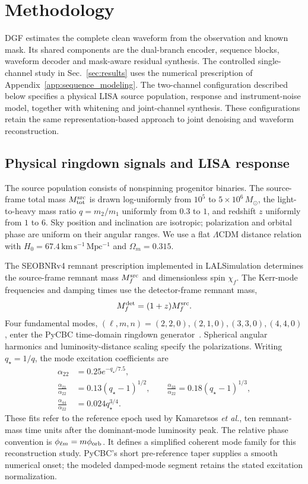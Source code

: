 \documentclass[10pt,prd,aps,a4paper,twocolumn,superscriptaddress,nofootinbib,floatfix]{revtex4-2}
\begin{document}
\section{Methodology}\label{sec:method}
DGF estimates the complete clean waveform from the observation and known mask. Its shared components are the dual-branch encoder, sequence blocks, waveform decoder and mask-aware residual synthesis. The controlled single-channel study in Sec.~\ref{sec:results} uses the numerical prescription of Appendix~\ref{app:sequence_modeling}. The two-channel configuration described below specifies a physical LISA source population, response and instrument-noise model, together with whitening and joint-channel synthesis. These configurations retain the same representation-based approach to joint denoising and waveform reconstruction.
\subsection{Physical ringdown signals and LISA response}\label{sec:physical_signals}
The source population consists of nonspinning progenitor binaries. The source-frame total mass $M_{\rm tot}^{\rm src}$ is drawn log-uniformly from $10^5$ to $5\times10^6\,M_\odot$, the light-to-heavy mass ratio $q=m_2/m_1$ uniformly from $0.3$ to $1$, and redshift $z$ uniformly from $1$ to $6$. Sky position and inclination are isotropic; polarization and orbital phase are uniform on their angular ranges. We use a flat $\Lambda$CDM distance relation with $H_0=67.4\,\mathrm{km\,s^{-1}\,Mpc^{-1}}$ and $\Omega_m=0.315$.

The SEOBNRv4 remnant prescription implemented in LALSimulation determines the source-frame remnant mass $M_f^{\rm src}$ and dimensionless spin $\chi_f$. The Kerr-mode frequencies and damping times use the detector-frame remnant mass,
\begin{equation}
M_f^{\rm det}=(1+z)M_f^{\rm src}.
\end{equation}
Four fundamental modes, $(\ell,m,n)=(2,2,0),(2,1,0),(3,3,0),(4,4,0)$, enter the PyCBC time-domain ringdown generator~\cite{berti2006gravitational,berti2009qnm,PyCBCRingdown}. Spherical angular harmonics and luminosity-distance scaling specify the polarizations. Writing $q_\star=1/q$, the mode excitation coefficients are~\cite{Kamaretsos2012}
\begin{align}
\alpha_{22}&=0.25e^{-q_\star/7.5},\nonumber\\
\frac{\alpha_{21}}{\alpha_{22}}&=0.13(q_\star-1)^{1/2},\qquad
\frac{\alpha_{33}}{\alpha_{22}}=0.18(q_\star-1)^{1/3},\nonumber\\
\frac{\alpha_{44}}{\alpha_{22}}&=0.024q_\star^{3/4}.
\end{align}
These fits refer to the reference epoch used by Kamaretsos \textit{et al.}, ten remnant-mass time units after the dominant-mode luminosity peak. The relative phase convention is $\phi_{\ell m}=m\phi_{\rm orb}$. It defines a simplified coherent mode family for this reconstruction study. PyCBC's short pre-reference taper supplies a smooth numerical onset; the modeled damped-mode segment retains the stated excitation normalization.
\end{document}
